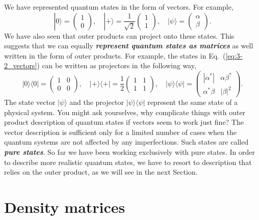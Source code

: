 We have represented quantum states in the form of vectors.
For example,
\begin{equation}
    |0\rangle = \begin{pmatrix} 1 \\ 0 \end{pmatrix}, \quad |+\rangle = \frac{1}{\sqrt{2}} \begin{pmatrix} 1 \\ 1 \end{pmatrix}, \quad |\psi\rangle = \begin{pmatrix} \alpha \\ \beta \end{pmatrix}.
    \label{eq:3-2_vectors}
\end{equation}
We have also seen that outer products can project onto these states.
This suggests that we can equally \textbf{\emph{represent quantum states as matrices}} as well written in the form of outer products.
For example, the states in Eq.~(\ref{eq:3-2_vectors}) can be written as projectors in the following way,
\begin{equation}
    |0\rangle\langle0| = \begin{pmatrix} 1 & 0 \\ 0 & 0 \end{pmatrix}, \quad |+\rangle\langle+| = \frac{1}{2} \begin{pmatrix} 1 & 1 \\ 1 & 1 \end{pmatrix}, \quad |\psi\rangle\langle\psi| = \begin{pmatrix} |\alpha^*| & \alpha\beta^* \\ \alpha^*\beta & |\beta|^2 \end{pmatrix}.
\end{equation}
The state vector $|\psi\rangle$ and the projector $|\psi\rangle\langle\psi|$ represent the same state of a physical system.
You might ask yourselves, why complicate things with outer product description of quantum states if vectors seem to work just fine?
The vector description is sufficient only for a limited number of cases when the quantum systems are not affected by any imperfections.
Such states are called \textbf{\emph{pure states}}.
So far we have been working exclusively with pure states.
In order to describe more realistic quantum states, we have to resort to description that relies on the outer product, as we will see in the next Section.



\section{Density matrices}
\label{sec:3-3_density_matrices}

